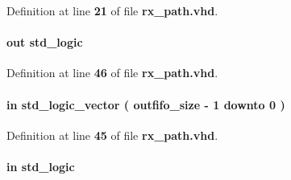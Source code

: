 Definition at line {\bf 21} of file {\bf rx\+\_\+path.\+vhd}.

\paragraph[{outfifo\+\_\+wr}]{ {\bfseries \textcolor{keywordflow}{out}\textcolor{vhdlchar}{ }} {\bfseries \textcolor{comment}{std\+\_\+logic}\textcolor{vhdlchar}{ }} \hspace{0.3cm}{\ttfamily [Port]}}\label{classrx__path_a0c41b293e5ec9e2c01bc187521edce25}


Definition at line {\bf 46} of file {\bf rx\+\_\+path.\+vhd}.

\paragraph[{outfifo\+\_\+wrusedw}]{ {\bfseries \textcolor{keywordflow}{in}\textcolor{vhdlchar}{ }} {\bfseries \textcolor{comment}{std\+\_\+logic\+\_\+vector}\textcolor{vhdlchar}{ }\textcolor{vhdlchar}{(}\textcolor{vhdlchar}{ }\textcolor{vhdlchar}{ }\textcolor{vhdlchar}{ }\textcolor{vhdlchar}{ }{\bfseries {\bf outfifo\+\_\+size}} \textcolor{vhdlchar}{-\/}\textcolor{vhdlchar}{ } \textcolor{vhdldigit}{1} \textcolor{vhdlchar}{ }\textcolor{keywordflow}{downto}\textcolor{vhdlchar}{ }\textcolor{vhdlchar}{ } \textcolor{vhdldigit}{0} \textcolor{vhdlchar}{ }\textcolor{vhdlchar}{)}\textcolor{vhdlchar}{ }} \hspace{0.3cm}{\ttfamily [Port]}}\label{classrx__path_ac482f44128ce45ae417868df13c2bc9e}


Definition at line {\bf 45} of file {\bf rx\+\_\+path.\+vhd}.

\paragraph[{pct\+\_\+clr\+\_\+detect}]{ {\bfseries \textcolor{keywordflow}{in}\textcolor{vhdlchar}{ }} {\bfseries \textcolor{comment}{std\+\_\+logic}\textcolor{vhdlchar}{ }} \hspace{0.3cm}{\ttfamily [Port]}}\label{classrx__path_a9f620580cd7670d2d6b51a64c2d61117}


